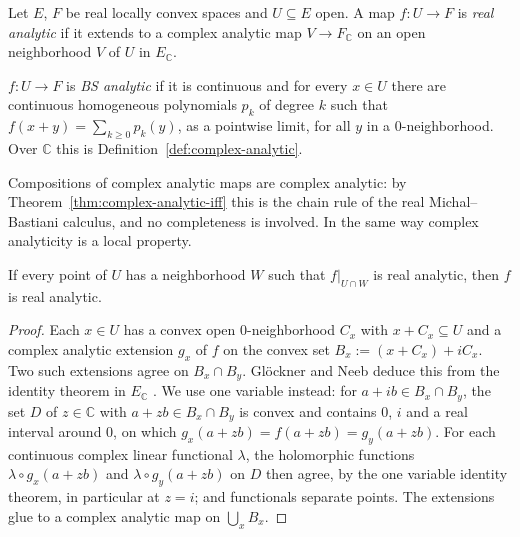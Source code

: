 \begin{definition}
  \label{def:real-analytic}
  \leanok
  Let $E$, $F$ be real locally convex spaces and $U \subseteq E$ open. A map $f \colon U \to F$ is
  \emph{real analytic} if it extends to a complex analytic map $V \to F_{\mathbb{C}}$ on an open
  neighborhood $V$ of $U$ in $E_{\mathbb{C}}$.
\end{definition}

\begin{definition}
  \label{def:bs-analytic}
  \leanok
  $f \colon U \to F$ is \emph{BS analytic} if it is continuous and for every $x \in U$ there are
  continuous homogeneous polynomials $p_k$ of degree $k$ such that
  $f(x + y) = \sum_{k \ge 0} p_k(y)$, as a pointwise limit, for all $y$ in a $0$-neighborhood.
  Over $\mathbb{C}$ this is Definition~\ref{def:complex-analytic}.
\end{definition}

Compositions of complex analytic maps are complex analytic: by
Theorem~\ref{thm:complex-analytic-iff} this is the chain rule of the real Michal--Bastiani
calculus, and no completeness is involved. In the same way complex analyticity is a local
property.

\begin{lemma}
  \label{lem:real-analytic-local}
  \leanok
  If every point of $U$ has a neighborhood $W$ such that $f|_{U \cap W}$ is real analytic, then
  $f$ is real analytic.
\end{lemma}

\begin{proof}
  \leanok
  Each $x \in U$ has a convex open $0$-neighborhood $C_x$ with $x + C_x \subseteq U$ and a
  complex analytic extension $g_x$ of $f$ on the convex set $B_x := (x + C_x) + i C_x$. Two such
  extensions agree on $B_x \cap B_y$. Glöckner and Neeb deduce this from the identity theorem in
  $E_{\mathbb{C}}$ \cite[Thm.~2.1.16(c)]{GN26}. We use one variable instead: for $a + ib \in B_x
  \cap B_y$, the set $D$ of $z \in \mathbb{C}$ with $a + zb \in B_x \cap B_y$ is convex and
  contains $0$, $i$ and a real interval around $0$, on which $g_x(a + zb) = f(a + zb) =
  g_y(a + zb)$. For each continuous complex linear functional $\lambda$, the holomorphic
  functions $\lambda \circ g_x(a + zb)$ and $\lambda \circ g_y(a + zb)$ on $D$ then agree, by the
  one variable identity theorem, in particular at $z = i$; and functionals separate points.
  The extensions glue to a complex analytic map on $\bigcup_x B_x$.
\end{proof}

